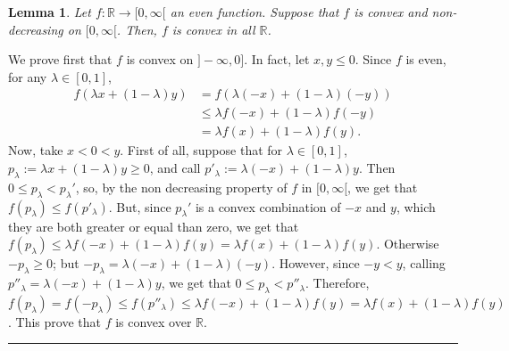 \documentclass[11pt,a4paper]{amsart}
\newcommand{\kw}{\rule{2mm}{2mm}}
\newcommand{\reals}{\mathbb{R}}
\renewenvironment{proof}{{Proof.}}{\hfill\kw}
\newtheorem{lemma}{{Lemma}}
\begin{document}
 
\begin{lemma}
    Let $f:\reals \to [0,\infty[$ an even function. Suppose that $f$ is convex and non-decreasing on $[0,\infty[$. Then, $f$ is convex in all $\reals$.
\end{lemma}
\begin{proof}
    We prove first that $f$ is convex on $]-\infty,0]$. In fact, let $x,y\le 0$. Since $f$ is even, for any $\lambda\in [0,1]$, \begin{align*}
        f(\lambda x+(1-\lambda)y)&=f(\lambda(-x)+(1-\lambda)(-y))\\
        &\le \lambda f(-x)+(1-\lambda)f(-y)\\
        &=\lambda f(x)+(1-\lambda)f(y).
    \end{align*}
    Now, take $x<0<y$. First of all, suppose that for $\lambda\in [0,1]$, $p_{\lambda}:=\lambda x+(1-\lambda)y\ge 0$, and call $p'_{\lambda}:=\lambda(-x)+(1-\lambda)y$. Then $0\le p_{\lambda}<p_{\lambda}'$, so, by the non decreasing property of $f$ in $[0,\infty[$, we get that $f(p_{\lambda})\le f(p'_\lambda)$. But, since $p_{\lambda}'$ is a convex combination of $-x$ and $y$, which they are both greater or equal than zero, we get that $f(p_{\lambda})\le \lambda f(-x)+(1-\lambda)f(y)=\lambda f(x)+(1-\lambda)f(y)$. Otherwise $-p_{\lambda}\ge 0$; but $-p_{\lambda}=\lambda(-x)+(1-\lambda)(-y)$. However, since $-y<y$, calling $p''_{\lambda}=\lambda(-x)+(1-\lambda)y$, we get that $0\le p_\lambda<p''_{\lambda}$. Therefore, $f(p_{\lambda})=f(-p_{\lambda})\le f(p''_{\lambda})\le \lambda f(-x)+(1-\lambda)f(y)=\lambda f(x)+(1-\lambda)f(y)$. This prove that $f$ is convex over $\reals$.\\

    
    
\end{proof}
\end{document}
